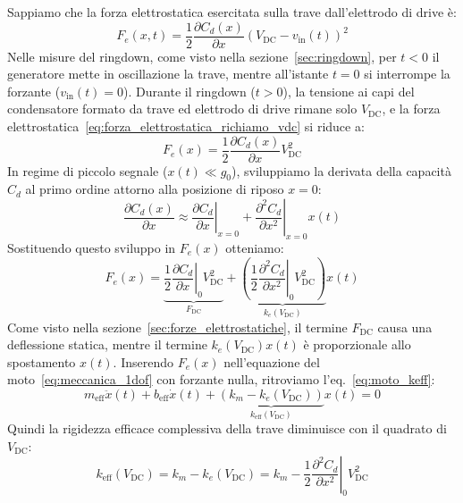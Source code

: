 \documentclass[11pt,a4paper]{article}
\begin{document}
\vspace{0.3cm}
\noindent Sappiamo che la forza elettrostatica esercitata sulla trave dall'elettrodo di drive è:
\begin{equation}
    \label{eq:forza_elettrostatica_richiamo_vdc}
    F_e(x, t)= \frac{1}{2} \frac{\partial C_d(x)}{\partial x} \left( V_{\text{DC}} - v_{\text{in}}(t) \right)^2
\end{equation}
 Nelle misure del ringdown, come visto nella sezione~\ref{sec:ringdown}, per $t < 0$ il generatore mette in oscillazione la trave, mentre all'istante $t = 0$ si interrompe la forzante ($v_{\text{in}}(t) = 0$). Durante il ringdown ($t > 0$), la tensione ai capi del condensatore formato da trave ed elettrodo di drive rimane solo $V_{\text{DC}}$, e la forza elettrostatica~\eqref{eq:forza_elettrostatica_richiamo_vdc} si riduce a:
\begin{equation}
    F_e(x) = \frac{1}{2} \frac{\partial C_d(x)}{\partial x} V_{\text{DC}}^2
\end{equation}
In regime di piccolo segnale ($x(t) \ll g_0$), sviluppiamo la derivata della capacità $C_d$ al primo ordine attorno alla posizione di riposo $x = 0$:
\begin{equation}
    \frac{\partial C_d(x)}{\partial x} \approx \left. \frac{\partial C_d}{\partial x} \right|_{x=0} + \left. \frac{\partial^2 C_d}{\partial x^2} \right|_{x=0} x(t)
\end{equation}
Sostituendo questo sviluppo in $F_e(x)$ otteniamo:
\begin{equation}
    F_e(x) = \underbrace{\frac{1}{2} \left. \frac{\partial C_d}{\partial x} \right|_0 V_{\text{DC}}^2}_{F_{\text{DC}}} + \underbrace{\left( \frac{1}{2} \left. \frac{\partial^2 C_d}{\partial x^2} \right|_0 V_{\text{DC}}^2 \right)}_{k_e(V_{\text{DC}})} x(t)
\end{equation}
Come visto nella sezione~\ref{sec:forze_elettrostatiche}, il termine $F_{\text{DC}}$ causa una deflessione statica, mentre il termine $k_e(V_{\text{DC}}) x(t)$ è proporzionale allo spostamento $x(t)$. Inserendo $F_e(x)$ nell'equazione del moto~\eqref{eq:meccanica_1dof} con forzante nulla,  ritroviamo l'eq.~\eqref{eq:moto_keff}:
\begin{equation}
    m_{\text{eff}} \ddot{x}(t) + b_{\text{eff}} \dot{x}(t) + \underbrace{\left( k_m - k_e(V_{\text{DC}}) \right)}_{k_{\text{eff}}(V_{\text{DC}})} x(t) = 0
\end{equation}
Quindi la rigidezza efficace complessiva della trave diminuisce con il quadrato di $V_{\text{DC}}$:
\begin{equation}
    \label{eq:keff_vdc_cap12}
    k_{\text{eff}}(V_{\text{DC}}) = k_m - k_e(V_{\text{DC}}) = k_m - \frac{1}{2} \left. \frac{\partial^2 C_d}{\partial x^2} \right|_0 V_{\text{DC}}^2
\end{equation}
\end{document}
